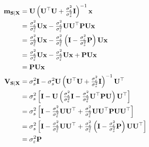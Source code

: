 \begin{align}
\label{Filt:msx2}
{\bf m}_{{\bf S}|{\bf X}}
      &= {\mathbf U} \left({\mathbf U}^\top{\mathbf U} + \tfrac{\sigma_\varepsilon^2}{\sigma_s^2} {\mathbf I} \right)^{-1}{\mathbf x}  
         \nonumber\\
      &= \tfrac{\sigma_s^2}{\sigma_\varepsilon^2} {\mathbf U} {\mathbf x} 
    	   - \tfrac{\sigma_s^2}{\sigma_\varepsilon^2} 
    	     {\mathbf U} {\mathbf U}^\top  {\mathbf P} 
	     {\mathbf U} {\mathbf x}  \nonumber\\
      &= \tfrac{\sigma_s^2}{\sigma_\varepsilon^2} {\mathbf U} {\mathbf x} 
    	   - \tfrac{\sigma_s^2}{\sigma_\varepsilon^2} 
    	     \left({\mathbf I} - \tfrac{\sigma_\varepsilon^2}{\sigma_s^2} {\mathbf P} \right)
	     {\mathbf U} {\mathbf x}  \nonumber\\
      &= \tfrac{\sigma_s^2}{\sigma_\varepsilon^2} {\mathbf U} {\mathbf x} 
    	   - \tfrac{\sigma_s^2}{\sigma_\varepsilon^2} {\mathbf U} {\mathbf x} 
    	   + {\mathbf P} {\mathbf U} {\mathbf x}  \nonumber\\
      &= {\mathbf P} {\mathbf U} {\mathbf x}  \\
{\bf V}_{{\bf S}|{\bf X}} 
      &= \sigma_s^2{\mathbf I} 
       - \sigma_s^2{\mathbf U} \left({\mathbf U}^\top {\mathbf U} + \tfrac{\sigma_\varepsilon^2}{\sigma_s^2}{\mathbf I}\right)^{-1}
          {\mathbf U}^\top    \nonumber\\
      &= \sigma_s^2
         \left[  {\mathbf I} 
               - {\mathbf U}
                 \left(\tfrac{\sigma_s^2}{\sigma_\varepsilon^2}{\mathbf I} 
     	             - \tfrac{\sigma_s^2}{\sigma_\varepsilon^2} {\mathbf U}^\top{\mathbf P}{\mathbf U}
                 \right)
                 {\mathbf U}^\top
         \right]    \nonumber\\
      &= \sigma_s^2
         \left[  {\mathbf I}
               - \tfrac{\sigma_s^2}{\sigma_\varepsilon^2} {\mathbf U} {\mathbf U}^\top
               + \tfrac{\sigma_s^2}{\sigma_\varepsilon^2} {\mathbf U} {\mathbf U}^\top{\mathbf P}{\mathbf U}
                 {\mathbf U}^\top
         \right]    \nonumber\\
      &= \sigma_s^2
         \left[  {\mathbf I}
               - \tfrac{\sigma_s^2}{\sigma_\varepsilon^2} {\mathbf U} {\mathbf U}^\top
               + \tfrac{\sigma_s^2}{\sigma_\varepsilon^2} 
                 \left({\mathbf I} - \tfrac{\sigma_\varepsilon^2}{\sigma_s^2} {\mathbf P}\right){\mathbf U}
                 {\mathbf U}^\top
         \right]    \nonumber\\
      &= \sigma_\varepsilon^2 {\mathbf P}
\end{align}

